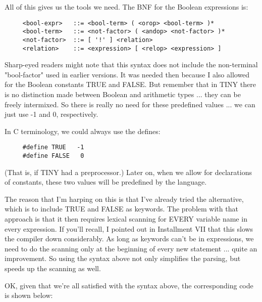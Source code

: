 All of this  gives us the tools we need. The BNF for the Boolean expressions is:

\begin{verbatim}
     <bool-expr>   ::= <bool-term> ( <orop> <bool-term> )*
     <bool-term>   ::= <not-factor> ( <andop> <not-factor> )*
     <not-factor>  ::= [ '!' ] <relation>
     <relation>    ::= <expression> [ <relop> <expression> ]
\end{verbatim}

Sharp-eyed readers might  note  that this syntax does not include the non-terminal  "bool-factor" used in earlier versions. It was needed then because I also allowed for the Boolean constants TRUE and FALSE. But  remember  that  in TINY there is no distinction made between Boolean and arithmetic  types ... they can be freely intermixed. So there is really no  need  for  these  predefined values ... we can just use -1 and 0, respectively.

In C terminology, we could always use the defines:

\begin{verbatim}
     #define TRUE   -1
     #define FALSE   0
\end{verbatim}

(That is, if TINY had a  preprocessor.)   Later on, when we allow for  declarations  of  constants, these  two   values   will  be predefined by the language.

The reason that I'm harping on this is that  I've  already  tried the alternative, which is to  include TRUE and FALSE as keywords. The problem with that approach is that it  then  requires lexical scanning for EVERY variable name  in every expression. If you'll recall, I pointed out in Installment VII  that  this  slows  the compiler  down considerably. As long as  keywords  can't  be  in expressions, we need to do the scanning only at the  beginning of every  new  statement  ... quite  an improvement. So using  the syntax above not only simplifies the parsing, but  speeds  up the scanning as well.

OK, given that we're  all  satisfied  with  the syntax above, the corresponding code is shown below:


